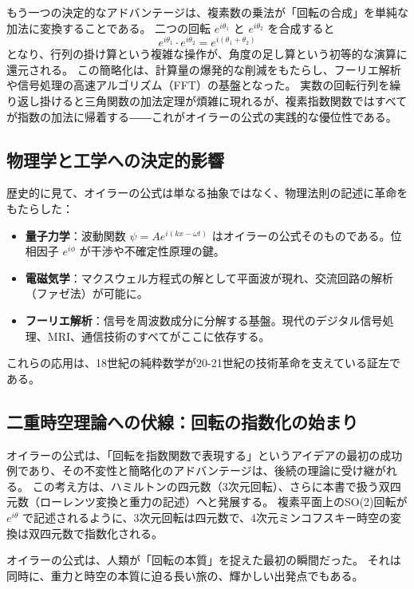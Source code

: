 \documentclass[dvipdfmx,a4paper]{jsbook}
\theoremstyle{definition}
\theoremstyle{remark}
\begin{document}
もう一つの決定的なアドバンテージは、複素数の乗法が「回転の合成」を単純な加法に変換することである。
二つの回転 $e^{i\theta_1}$ と $e^{i\theta_2}$ を合成すると
\begin{equation}
  e^{i\theta_1} \cdot e^{i\theta_2} = e^{i(\theta_1 + \theta_2)}
\end{equation}
となり、行列の掛け算という複雑な操作が、角度の足し算という初等的な演算に還元される。
この簡略化は、計算量の爆発的な削減をもたらし、フーリエ解析や信号処理の高速アルゴリズム（FFT）の基盤となった。
実数の回転行列を繰り返し掛けると三角関数の加法定理が煩雑に現れるが、複素指数関数ではすべてが指数の加法に帰着する――これがオイラーの公式の実践的な優位性である。

\subsection{物理学と工学への決定的影響}

歴史的に見て、オイラーの公式は単なる抽象ではなく、物理法則の記述に革命をもたらした：
\begin{itemize}
  \item \textbf{量子力学}：波動関数 $\psi = A e^{i(kx - \omega t)}$ はオイラーの公式そのものである。位相因子 $e^{i\phi}$ が干渉や不確定性原理の鍵。
  \item \textbf{電磁気学}：マクスウェル方程式の解として平面波が現れ、交流回路の解析（ファゼ法）が可能に。
  \item \textbf{フーリエ解析}：信号を周波数成分に分解する基盤。現代のデジタル信号処理、MRI、通信技術のすべてがここに依存する。
\end{itemize}

これらの応用は、18世紀の純粋数学が20-21世紀の技術革命を支えている証左である。

\subsection{二重時空理論への伏線：回転の指数化の始まり}

オイラーの公式は、「回転を指数関数で表現する」というアイデアの最初の成功例であり、その不変性と簡略化のアドバンテージは、後続の理論に受け継がれる。
この考え方は、ハミルトンの四元数（3次元回転）、さらに本書で扱う双四元数（ローレンツ変換と重力の記述）へと発展する。
複素平面上のSO(2)回転が $e^{i\theta}$ で記述されるように、3次元回転は四元数で、4次元ミンコフスキー時空の変換は双四元数で指数化される。

オイラーの公式は、人類が「回転の本質」を捉えた最初の瞬間だった。
それは同時に、重力と時空の本質に迫る長い旅の、輝かしい出発点でもある。
\end{document}
